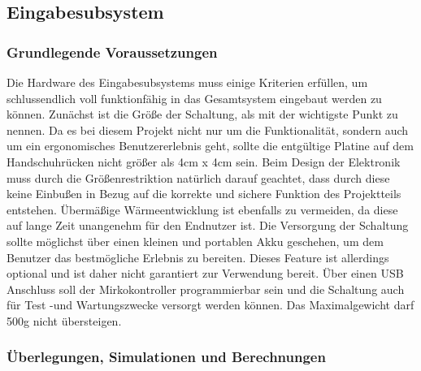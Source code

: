 \documentclass[titlepage,12pt,twoside]{article}
\begin{document}
\subsection{Eingabesubsystem}

\subsubsection{Grundlegende Voraussetzungen}
Die Hardware des Eingabesubsystems muss einige Kriterien erfüllen, um schlussendlich voll funktionfähig in das Gesamtsystem eingebaut 
werden zu können. Zunächst ist die Größe der Schaltung, als mit der wichtigste Punkt zu nennen. Da es bei diesem Projekt nicht nur
um die Funktionalität, sondern auch um ein ergonomisches Benutzererlebnis geht, sollte die entgültige Platine auf dem Handschuhrücken
nicht größer als 4cm x 4cm sein. Beim Design der Elektronik muss durch die Größenrestriktion natürlich darauf geachtet, dass durch
diese keine Einbußen in Bezug auf die korrekte und sichere Funktion des Projektteils entstehen. Übermäßige Wärmeentwicklung ist 
ebenfalls zu vermeiden, da diese auf lange Zeit unangenehm für den Endnutzer ist. Die Versorgung der Schaltung
sollte möglichst über einen kleinen und portablen Akku geschehen, um dem Benutzer das bestmögliche Erlebnis zu bereiten. Dieses Feature ist
allerdings optional und ist daher nicht garantiert zur Verwendung bereit. Über einen USB Anschluss soll der Mirkokontroller programmierbar sein und die Schaltung
auch für Test -und Wartungszwecke versorgt werden können. Das Maximalgewicht darf 500g nicht übersteigen. \\

\subsubsection{Überlegungen, Simulationen und Berechnungen}
\label{chap:Überlegungen, Simulationen und Berechnungen}
\end{document}
